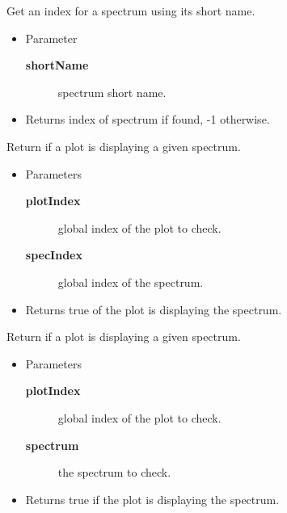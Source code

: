 \begin{desc}Get an index for a spectrum using its short name.
\begin{itemize}
\item{Parameter
  \begin{description}
   \item[\textbf{shortName}]{spectrum short name.}
  \end{description}}
\end{itemize}
\begin{itemize}
\item{Returns index of spectrum if found, -1 otherwise. }
\end{itemize}
\end{desc}

\begin{desc}Return if a plot is displaying a given spectrum.
\begin{itemize}
\item{Parameters
  \begin{description}
   \item[\textbf{plotIndex}]{global index of the plot to check.}
   \item[\textbf{specIndex}]{global index of the spectrum.}
  \end{description}}
\end{itemize}
\begin{itemize}
\item{Returns true of the plot is displaying the spectrum. }
\end{itemize}
\end{desc}

\begin{desc}Return if a plot is displaying a given spectrum.
\begin{itemize}
\item{Parameters
  \begin{description}
   \item[\textbf{plotIndex}]{global index of the plot to check.}
   \item[\textbf{spectrum}]{the spectrum to check.}
  \end{description}}
\end{itemize}
\begin{itemize}
\item{Returns true if the plot is displaying the spectrum. }
\end{itemize}
\end{desc}

